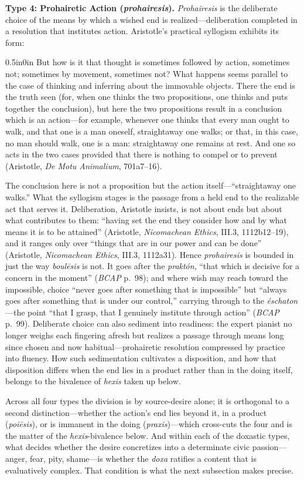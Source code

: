 \textbf{Type 4: Prohairetic Action (\textit{prohairesis}).} \textit{Prohairesis} is the deliberate choice of the means by which a wished end is realized---deliberation completed in a resolution that institutes action. Aristotle's practical syllogism exhibits its form:

\begin{adjustwidth}{0.5in}{0in}
But how is it that thought is sometimes followed by action, sometimes not; sometimes by movement, sometimes not? What happens seems parallel to the case of thinking and inferring about the immovable objects. There the end is the truth seen (for, when one thinks the two propositions, one thinks and puts together the conclusion), but here the two propositions result in a conclusion which is an action---for example, whenever one thinks that every man ought to walk, and that one is a man oneself, straightaway one walks; or that, in this case, no man should walk, one is a man: straightaway one remains at rest. And one so acts in the two cases provided that there is nothing to compel or to prevent (Aristotle, \textit{De Motu Animalium}, 701a7--16).
\end{adjustwidth}

The conclusion here is not a proposition but the action itself---``straightaway one walks.'' What the syllogism stages is the passage from a held end to the realizable act that serves it. Deliberation, Aristotle insists, is not about ends but about what contributes to them: ``having set the end they consider how and by what means it is to be attained'' (Aristotle, \textit{Nicomachean Ethics}, III.3, 1112b12--19), and it ranges only over ``things that are in our power and can be done'' (Aristotle, \textit{Nicomachean Ethics}, III.3, 1112a31). Hence \textit{prohairesis} is bounded in just the way \textit{boulēsis} is not. It goes after the \textit{praktón}, ``that which is decisive for a concern in the moment'' (\textit{BCAP} p.~98); and where wish may reach toward the impossible, choice ``never goes after something that is impossible'' but ``always goes after something that is under our control,'' carrying through to the \textit{éschaton}---the point ``that I grasp, that I genuinely institute through action'' (\textit{BCAP} p.~99). Deliberate choice can also sediment into readiness: the expert pianist no longer weighs each fingering afresh but realizes a passage through means long since chosen and now habitual---prohairetic resolution compressed by practice into fluency. How such sedimentation cultivates a disposition, and how that disposition differs when the end lies in a product rather than in the doing itself, belongs to the bivalence of \textit{hexis} taken up below.

Across all four types the division is by source-desire alone; it is orthogonal to a second distinction---whether the action's end lies beyond it, in a product (\textit{poiēsis}), or is immanent in the doing (\textit{praxis})---which cross-cuts the four and is the matter of the \textit{hexis}-bivalence below. And within each of the doxastic types, what decides whether the desire concretizes into a determinate civic passion---anger, fear, pity, shame---is whether the \textit{doxa} ratifies a content that is evaluatively complex. That condition is what the next subsection makes precise.
